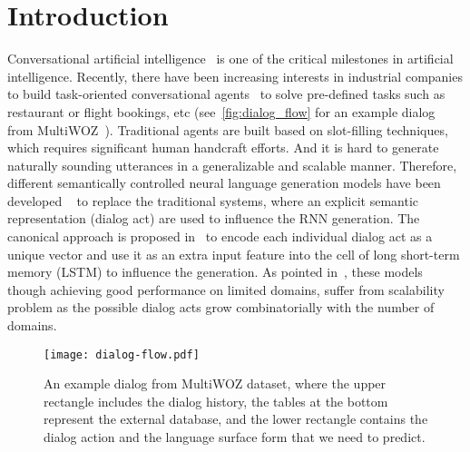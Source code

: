 \documentclass[11pt,a4paper]{article}
\begin{document}
\section{Introduction}
Conversational artificial intelligence~\cite{young2013pomdp} is one of the critical milestones in artificial intelligence. Recently, there have been increasing interests in industrial companies to build task-oriented conversational agents~\cite{DBLP:conf/icml/WenMBY17,DBLP:conf/ijcnlp/LiCLGC17,DBLP:conf/eacl/Rojas-BarahonaG17} to solve pre-defined tasks such as restaurant or flight bookings, etc (see~\autoref{fig:dialog_flow} for an example dialog from MultiWOZ~\cite{DBLP:conf/emnlp/BudzianowskiWTC18}). Traditional agents are built based on slot-filling techniques, which requires significant human handcraft efforts. And it is hard to generate naturally sounding utterances in a generalizable and scalable manner. Therefore, different semantically controlled neural language generation models have been developed ~\cite{DBLP:conf/emnlp/WenGMSVY15,DBLP:conf/emnlp/WenGMRSUVY16,DBLP:conf/naacl/WenGMRSVY16,DBLP:conf/sigdial/DusekJ16} to replace the traditional systems, where an explicit semantic representation (dialog act) are used to influence the RNN generation. The canonical approach is proposed in~\cite{DBLP:conf/emnlp/WenGMSVY15} to encode each individual dialog act as a unique vector and use it as an extra input feature into the cell of long short-term memory (LSTM) to influence the generation. As pointed in~\cite{DBLP:conf/naacl/WenGMRSVY16}, these models though achieving good performance on limited domains, suffer from scalability problem as the possible dialog acts grow combinatorially with the number of domains.  
\begin{figure}[t]
    \begin{center}
    \texttt{[image: dialog-flow.pdf]}
    \end{center}
    \caption{An example dialog from MultiWOZ dataset, where the upper rectangle includes the dialog history, the tables at the bottom represent the external database, and the lower rectangle contains the dialog action and the language surface form that we need to predict.}
    \label{fig:dialog_flow}
\end{figure}
\end{document}
